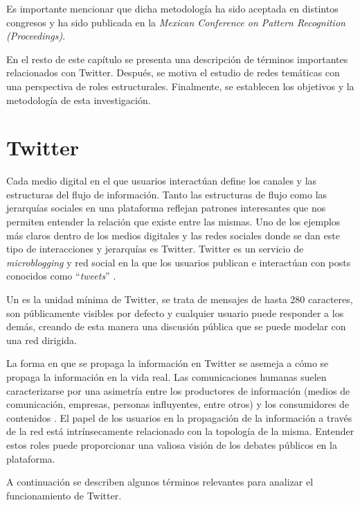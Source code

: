 Es importante mencionar que dicha metodología ha sido aceptada en distintos congresos y ha sido publicada en la \textit{Mexican Conference on Pattern Recognition (Proceedings)}.

En el resto de este capítulo se presenta una descripción de términos importantes relacionados con Twitter. Después, se motiva el estudio de redes temáticas con una perspectiva de roles estructurales. Finalmente, se establecen los objetivos y la metodología de esta investigación. 

\section{Twitter} 

Cada medio digital en el que usuarios interactúan define los canales y las estructuras del flujo de información. Tanto las estructuras de flujo como las jerarquías sociales en una plataforma reflejan patrones interesantes que nos permiten entender la relación que existe entre las mismas. Uno de los ejemplos más claros dentro de los medios digitales y las redes sociales donde se dan este tipo de interacciones y jerarquías es Twitter. Twitter es un servicio de \textit{microblogging} y red social en la que los usuarios publican e interactúan con posts conocidos como \enquote{\textit{tweets}} \cite{twitter_twittercom_nodate}. 

Un \tweet es la unidad mínima de Twitter, se trata de mensajes de hasta 280 caracteres, son públicamente visibles por defecto y cualquier usuario puede responder a los demás, creando de esta manera una discusión pública que se puede modelar con una red dirigida.

La forma en que se propaga la información en Twitter se asemeja a cómo se propaga la información en la vida real. Las comunicaciones humanas suelen caracterizarse por una asimetría entre los productores de información (medios de comunicación, empresas, personas influyentes, entre otros) y los consumidores de contenidos \cite{gabielkov_studying_2014}. El papel de los usuarios en la propagación de la información a través de la red está intrínsecamente relacionado con la topología de la misma. Entender estos roles puede proporcionar una valiosa visión de los debates públicos en la plataforma. 

A continuación se describen algunos términos relevantes para analizar el funcionamiento de Twitter. 


